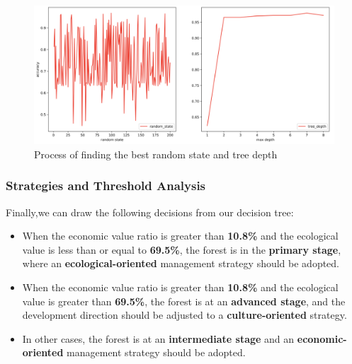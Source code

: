 \begin{figure}[H]
\centering
\vspace{-1ex}
\includegraphics[scale = 0.4]{mcmthesis-demo/figures/Random State and Max Depth.png}
\vspace{-2ex}
\caption{Process of finding the best random state and tree depth} 
\end{figure}

\subsubsection{Strategies and Threshold Analysis}
Finally,we can draw the following decisions from our decision tree:

\begin{itemize}
    \item When the economic value ratio is greater than \textbf{10.8\%} and the ecological value is less than or equal to \textbf{69.5\%}, the forest is in the \textbf{primary stage}, where an \textbf{ecological-oriented} management strategy should be adopted.
    
    \item When the economic value ratio is greater than \textbf{10.8\%} and the ecological value is greater than \textbf{69.5\%}, the forest is at an \textbf{advanced stage}, and the development direction should be adjusted to a \textbf{culture-oriented} strategy.
    
    \item In other cases, the forest is at an \textbf{intermediate stage} and an \textbf{economic-oriented} management strategy should be adopted.
\end{itemize}

